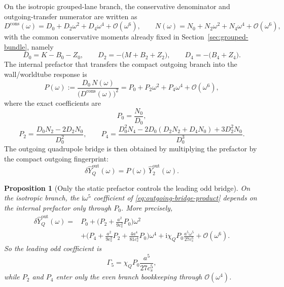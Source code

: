 \documentclass[11pt]{article}
\newtheorem{proposition}[theorem]{Proposition}
\theoremstyle{definition}
\newcommand{\ii}{\mathrm{i}}
\newcommand{\out}{\mathrm{out}}
\newcommand{\Yout}{\ensuremath{\widehat Y_2^{\out}}}
\newcommand{\cO}{\mathcal O}
\begin{document}
On the isotropic grouped-lane branch, the conservative denominator and outgoing-transfer numerator are written as
\begin{equation}
D^{\mathrm{cons}}(\omega)=D_0+D_2\omega^2+D_4\omega^4+\cO(\omega^6),
\qquad
N(\omega)=N_0+N_2\omega^2+N_4\omega^4+\cO(\omega^6),
\label{eq:outgoing-DN-expansions}
\end{equation}
with the common conservative moments already fixed in Section~\ref{sec:grouped-bundle}, namely
\begin{equation}
D_0=K-B_0-Z_0,
\qquad
D_2=-\bigl(M+B_2+Z_2\bigr),
\qquad
D_4=-\bigl(B_4+Z_4\bigr).
\label{eq:outgoing-isotropic-Dmoments}
\end{equation}
The internal prefactor that transfers the compact outgoing branch into the wall/worldtube response is
\begin{equation}
P(\omega):=\frac{D_0\,N(\omega)}{\bigl(D^{\mathrm{cons}}(\omega)\bigr)^2}
=
P_0+P_2\omega^2+P_4\omega^4+\cO(\omega^6),
\label{eq:outgoing-prefactor-def}
\end{equation}
where the exact coefficients are
\begin{equation}
P_0=\frac{N_0}{D_0},
\label{eq:outgoing-P0}
\end{equation}
\begin{equation}
P_2=\frac{D_0N_2-2D_2N_0}{D_0^2},
\qquad
P_4=\frac{D_0^2N_4-2D_0(D_2N_2+D_4N_0)+3D_2^2N_0}{D_0^3}.
\label{eq:outgoing-P24}
\end{equation}
The outgoing quadrupole bridge is then obtained by multiplying the prefactor by the compact outgoing fingerprint:
\begin{equation}
\delta\widehat Y_Q^{\out}(\omega)=P(\omega)\,\Yout(\omega).
\label{eq:outgoing-bridge-product}
\end{equation}

\begin{proposition}[Only the static prefactor controls the leading odd bridge]
On the isotropic branch, the $\ii\omega^5$ coefficient of \eqref{eq:outgoing-bridge-product} depends on the internal prefactor only through $P_0$. More precisely,
\begin{equation}
\begin{aligned}
\delta\widehat Y_Q^{\out}(\omega)
={}&
P_0
+
\biggl(P_2+\frac{a^2}{9c_s^2}P_0\biggr)\omega^2
\\[2pt]
&+
\biggl(P_4+\frac{a^2}{9c_s^2}P_2+\frac{4a^4}{81c_s^4}P_0\biggr)\omega^4
+
\ii\chi_Q P_0\frac{a^5\omega^5}{27c_s^5}
+
\cO(\omega^6).
\end{aligned}
\label{eq:outgoing-bridge-expanded}
\end{equation}
So the leading odd coefficient is
\begin{equation}
\Gamma_5=\chi_Q P_0\frac{a^5}{27c_s^5},
\label{eq:outgoing-Gamma5}
\end{equation}
while $P_2$ and $P_4$ enter only the even branch bookkeeping through $\cO(\omega^4)$.
\end{proposition}
\end{document}
